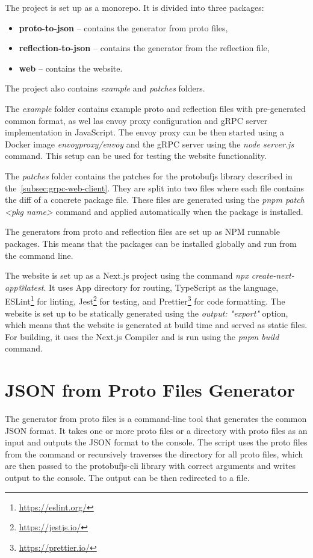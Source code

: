 The project is set up as a monorepo.
It is divided into three packages:
\begin{itemize}
    \item \textbf{proto-to-json} -- contains the generator from proto files,
    \item \textbf{reflection-to-json} -- contains the generator from the reflection file,
    \item \textbf{web} -- contains the website.
\end{itemize}
The project also contains \textit{example} and \textit{patches} folders.

The \textit{example} folder contains example proto and reflection files with pre-generated common format, as wel las envoy proxy configuration and gRPC server implementation in JavaScript.
The envoy proxy can be then started using a Docker image \textit{envoyproxy/envoy} and the gRPC server using the \textit{node server.js} command.
This setup can be used for testing the website functionality.

The \textit{patches} folder contains the patches for the protobufjs library described in the~\ref{subsec:grpc-web-client}.
They are split into two files where each file contains the diff of a concrete package file.
These files are generated using the \textit{pnpm patch <pkg name>} command and applied automatically when the package is installed.

The generators from proto and reflection files are set up as NPM runnable packages.
This means that the packages can be installed globally and run from the command line.

The website is set up as a Next.js project using the command \textit{npx create-next-app@latest}.
It uses App directory for routing, TypeScript as the language, ESLint\footnote{\url{https://eslint.org/}} for linting, Jest\footnote{\url{https://jestjs.io/}} for testing, and Prettier\footnote{\url{https://prettier.io/}} for code formatting.
The website is set up to be statically generated using the \textit{output: "export"} option, which means that the website is generated at build time and served as static files.
For building, it uses the Next.js Compiler and is run using the \textit{pnpm build} command.


\section{JSON from Proto Files Generator}
The generator from proto files is a command-line tool that generates the common JSON format.
It takes one or more proto files or a directory with proto files as an input and outputs the JSON format to the console.
The script uses the proto files from the command or recursively traverses the directory for all proto files, which are then passed to the protobufjs-cli library with correct arguments and writes output to the console.
The output can be then redirected to a file.

